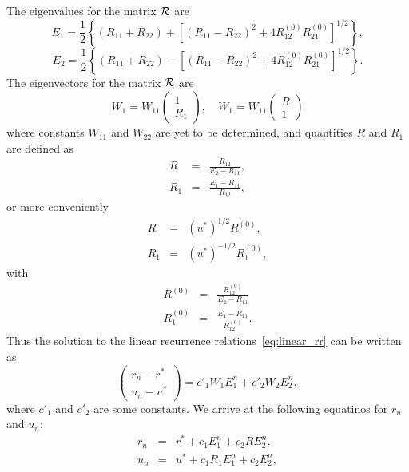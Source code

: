 The eigenvalues for the matrix $\cal{R}$ are
\begin{equation*}
	E_1 = \frac{1}{2} \left\{ (R_{11} + R_{22}) + \left[(R_{11} - R_{22})^2 + 4 R_{12}^{(0)}R_{21}^{(0)}\right]^{1/2}\right\},
\end{equation*}
\begin{equation*}
	E_2 = \frac{1}{2} \left\{ (R_{11} + R_{22}) - \left[(R_{11} - R_{22})^2 + 4 R_{12}^{(0)}R_{21}^{(0)}\right]^{1/2}\right\}.
\end{equation*}
The eigenvectors for the matrix $\cal{R}$ are
\begin{equation*}
	W_1 = W_{11} \left(
	\begin{array}{ll}
		1 
		\\ 
		R_1
	\end{array}
	\right)
	, \quad
	W_1 = W_{11} \left(
	\begin{array}{ll}
		R 
		\\ 
		1
	\end{array}
	\right)
\end{equation*}
where constants $W_{11}$ and $W_{22}$ are yet to be determined, and quantities $R$ and $R_1$ are defined as
\begin{eqnarray*}
	R & = & \frac{R_{12}}{E_2 - R_{11}}, 
	\\
	R_1 & = & \frac{E_1 - R_{11}}{R_{12}},
\end{eqnarray*}
or more conveniently
\begin{eqnarray*}
	R & = & (u^*)^{1/2}R^{(0)}, 
	\\
	R_1 & = & (u^*)^{-1/2}R_1^{(0)},
\end{eqnarray*}
with
\begin{eqnarray*}
	R^{(0)} & = & \frac{R_{12}^{(0)}}{E_2 - R_{11}}
	\\
	R_1^{(0)} & = & \frac{E_1 - R_{11}}{R_{12}^{(0)}}.
\end{eqnarray*}
Thus the solution to the linear recurrence relations~\eqref{eq:linear_rr} can be written as
\begin{equation}
	\left(
	\begin{array}{ll}
		r_n - r^*
		\\
		u_n - u^*
	\end{array}
	\right)
	= c'_1 W_1 E_1^n + c'_2 W_2 E_2^n,
\end{equation}
where $c'_1$ and $c'_2$ are some constants. We arrive at the following equatinos for $r_n$ and $u_n$:
\begin{eqnarray}
	r_n & = & r^* + c_1 E_1^n + c_2 R E_2^n,
	\nonumber \\
	u_n & = & u^* + c_1 R_1 E_1^n + c_2 E_2^n,
\end{eqnarray}
